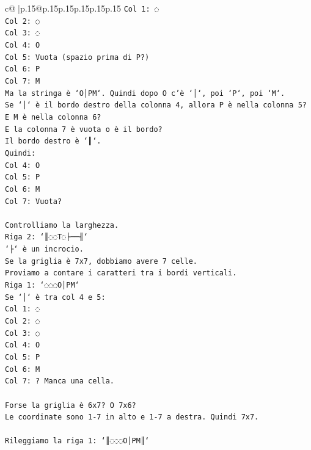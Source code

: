 \documentclass{article}
\begin{document}
{\begin{supertabular}{c@{$\;$}|p{.15\linewidth}@{}p{.15\linewidth}p{.15\linewidth}p{.15\linewidth}p{.15\linewidth}p{.15\linewidth}}
{{{\texttt{Col 1: ◌} \\
\texttt{Col 2: ◌} \\
\texttt{Col 3: ◌} \\
\texttt{Col 4: O} \\
\texttt{Col 5: Vuota (spazio prima di P?)} \\
\texttt{Col 6: P} \\
\texttt{Col 7: M} \\
\texttt{Ma la stringa è `O│PM`. Quindi dopo O c'è `│`, poi `P`, poi `M`.} \\
\texttt{Se `│` è il bordo destro della colonna 4, allora P è nella colonna 5?} \\
\texttt{E M è nella colonna 6?} \\
\texttt{E la colonna 7 è vuota o è il bordo?} \\
\texttt{Il bordo destro è `║`.} \\
\texttt{Quindi:} \\
\texttt{Col 4: O} \\
\texttt{Col 5: P} \\
\texttt{Col 6: M} \\
\texttt{Col 7: Vuota?} \\
\\ 
\texttt{Controlliamo la larghezza.} \\
\texttt{Riga 2: `║◌◌T◌├──╢`} \\
\texttt{`├` è un incrocio.} \\
\texttt{Se la griglia è 7x7, dobbiamo avere 7 celle.} \\
\texttt{Proviamo a contare i caratteri tra i bordi verticali.} \\
\texttt{Riga 1: `◌◌◌O│PM`} \\
\texttt{Se `│` è tra col 4 e 5:} \\
\texttt{Col 1: ◌} \\
\texttt{Col 2: ◌} \\
\texttt{Col 3: ◌} \\
\texttt{Col 4: O} \\
\texttt{Col 5: P} \\
\texttt{Col 6: M} \\
\texttt{Col 7: ? Manca una cella.} \\
\\ 
\texttt{Forse la griglia è 6x7? O 7x6?} \\
\texttt{Le coordinate sono 1{-}7 in alto e 1{-}7 a destra. Quindi 7x7.} \\
\\ 
\texttt{Rileggiamo la riga 1: `║◌◌◌O│PM║`} \\
}}}
\end{supertabular}}
\end{document}
